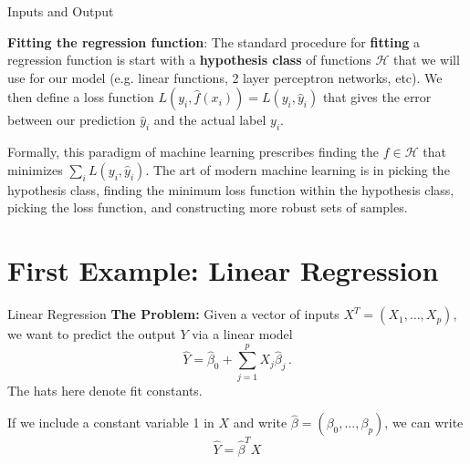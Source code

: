 \documentclass[10pt, handout]{beamer}
\begin{document}
\begin{frame}[fragile]{Inputs and Output}

\textbf{Fitting the regression function}: The standard procedure for \textbf{fitting} a regression function is start with a \textbf{hypothesis class} of functions $\mathcal{H}$ that we will use for our model (e.g. linear functions, 2 layer perceptron networks, etc). We then define a loss function $L(y_i,  \hat{f}(x_i)) = L(y_i, \hat{y}_i)$ that gives the error between our prediction $\hat{y}_i$ and the actual label $y_i$. \pause

Formally, this paradigm of machine learning prescribes finding the $f\in \mathcal{H}$ that minimizes $\sum_i L(y_i, \hat{y}_i)$. The art of modern machine learning is in picking the hypothesis class, finding the minimum loss function within the hypothesis class, picking the loss function, and constructing more robust sets of samples. 
\end{frame}





\section{First Example: Linear Regression} 
\begin{frame}[fragile]{Linear Regression}
\textbf{The Problem:} Given a vector of inputs $X^T = (X_1,\ldots, X_p)$, we want to predict the output $Y$ via a linear model
$$
\hat Y = \hat\beta_0 + \sum_{j=1}^pX_j\hat\beta_j\,.
$$
The hats here denote fit constants. 

\pause

If we include a constant variable 1 in $X$ and write $\hat \beta = (\beta_0,\ldots, \beta_p)$, we can write
$$
\hat Y = \hat \beta^T X
$$
\end{frame}
\end{document}
